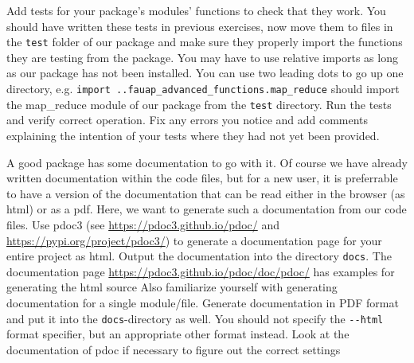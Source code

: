 \documentclass[]{erlangen-problemset}
\begin{document}
\begin{problem}[title={Building tests for our modules}]
\noindent
\Question Add tests for your package's modules' functions to check that they work. You should have written these tests in previous exercises, now move them to files in the \texttt{test} folder of our package and make sure they properly import the functions they are testing from the package. 
You may have to use relative imports as long as our package has not been installed. 
You can use two leading dots to go up one directory, e.g. \texttt{import ..fauap\_advanced\_functions.map\_reduce} should import the map\_reduce module of our package from the \texttt{test} directory.
\Question Run the tests and verify correct operation. Fix any errors you notice and add comments explaining the intention of your tests where they had not yet been provided.
\end{problem}

\begin{problem}[title={Generating documentation for your module}]
    A good package has some documentation to go with it. Of course we have already written documentation within the code files, but for a new user, it is preferrable to have a version of the documentation that can be read either in the browser (as html) or as a pdf. 
    Here, we want to generate such a documentation from our code files.
\noindent
\Question Use pdoc3 (see \url{https://pdoc3.github.io/pdoc/} and \url{https://pypi.org/project/pdoc3/}) to generate a documentation page for your entire project as html. 
Output the documentation into the directory \texttt{docs}.
The documentation page \url{https://pdoc3.github.io/pdoc/doc/pdoc/} has examples for generating the html source
\Question Also familiarize yourself with generating documentation for a single module/file. 
\Question Generate documentation in PDF format and put it into the \texttt{docs}-directory as well. You should not specify the \texttt{-\.-html} format specifier, but an appropriate other format instead. 
Look at the documentation of pdoc if necessary to figure out the correct settings
\end{problem}
\end{document}
